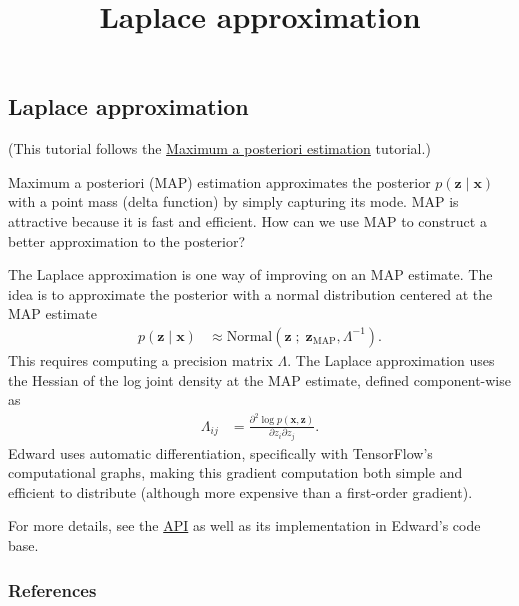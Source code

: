 \title{Laplace approximation}

\subsection{Laplace approximation}

(This tutorial follows the
\href{/tutorials/map}{Maximum a posteriori estimation} tutorial.)

Maximum a posteriori (MAP) estimation approximates the posterior $p(\mathbf{z} \mid \mathbf{x})$
with a point mass (delta function) by simply capturing its mode. MAP is
attractive because it is fast and efficient. How can we use MAP to construct a
better approximation to the posterior?

The Laplace approximation
\citep{laplace1986memoir}
is one way of improving on an MAP estimate. The idea
is to approximate the posterior with a normal distribution centered at the MAP
estimate
\begin{align*}
  p(\mathbf{z} \mid \mathbf{x})
  &\approx
  \text{Normal}(\mathbf{z}\;;\; \mathbf{z}_\text{MAP}, \Lambda^{-1}).
\end{align*}
This requires computing a precision matrix $\Lambda$. The Laplace approximation
uses the Hessian of the log joint density at the MAP estimate,
defined component-wise as
\begin{align*}
  \Lambda_{ij}
  &=
  \frac{\partial^2 \log p(\mathbf{x}, \mathbf{z})}{\partial z_i \partial z_j}.
\end{align*}
Edward uses automatic differentiation, specifically with TensorFlow's
computational graphs, making this gradient computation both simple and
efficient to distribute (although more expensive than a first-order
gradient).

For more details, see the \href{/api/}{API} as well as its
implementation in Edward's code base.

\subsubsection{References}\label{references}

